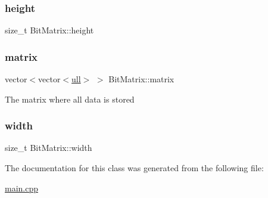 \subsubsection{\texorpdfstring{height}{height}}
{\footnotesize\ttfamily size\+\_\+t Bit\+Matrix\+::height\hspace{0.3cm}{\ttfamily [private]}}

\mbox{\label{classBitMatrix_abe5132a2524a8c5d5e5a11d0f4753bc6}} 
\subsubsection{\texorpdfstring{matrix}{matrix}}
{\footnotesize\ttfamily vector$<$vector$<$\hyperlink{main_8cpp_a49d1cb44c18ad3e6cc52845f905e6181}{ull}$>$ $>$ Bit\+Matrix\+::matrix\hspace{0.3cm}{\ttfamily [private]}}

The matrix where all data is stored \mbox{\label{classBitMatrix_a8f75a335960dd7af6fc791f43bc3a8c1}} 
\subsubsection{\texorpdfstring{width}{width}}
{\footnotesize\ttfamily size\+\_\+t Bit\+Matrix\+::width\hspace{0.3cm}{\ttfamily [private]}}



The documentation for this class was generated from the following file\+:\begin{DoxyCompactItemize}
\item 
\hyperlink{main_8cpp}{main.\+cpp}\end{DoxyCompactItemize}
